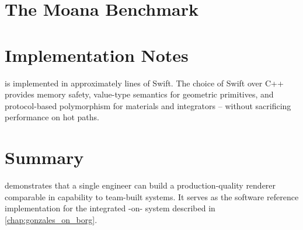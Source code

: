 
\section{The Moana Benchmark}


\section{Implementation Notes}

\gonzales{} is implemented in approximately  lines of Swift.
The choice of Swift over C++ provides memory safety, value-type semantics
for geometric primitives, and protocol-based polymorphism for materials
and integrators -- without sacrificing performance on hot paths.

\section{Summary}

\gonzales{} demonstrates that a single engineer can build a production-quality
renderer comparable in capability to team-built systems.
It serves as the software reference implementation for the integrated
\gonzales{}-on-\borg{} system described in \autoref{chap:gonzales_on_borg}.
